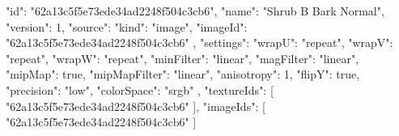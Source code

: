 {
  "id": "62a13c5f5e73ede34ad2248f504c3cb6",
  "name": "Shrub B Bark Normal",
  "version": 1,
  "source": {
    "kind": "image",
    "imageId": "62a13c5f5e73ede34ad2248f504c3cb6"
  },
  "settings": {
    "wrapU": "repeat",
    "wrapV": "repeat",
    "wrapW": "repeat",
    "minFilter": "linear",
    "magFilter": "linear",
    "mipMap": true,
    "mipMapFilter": "linear",
    "anisotropy": 1,
    "flipY": true,
    "precision": "low",
    "colorSpace": "srgb"
  },
  "textureIds": [
    "62a13c5f5e73ede34ad2248f504c3cb6"
  ],
  "imageIds": [
    "62a13c5f5e73ede34ad2248f504c3cb6"
  ]
}
